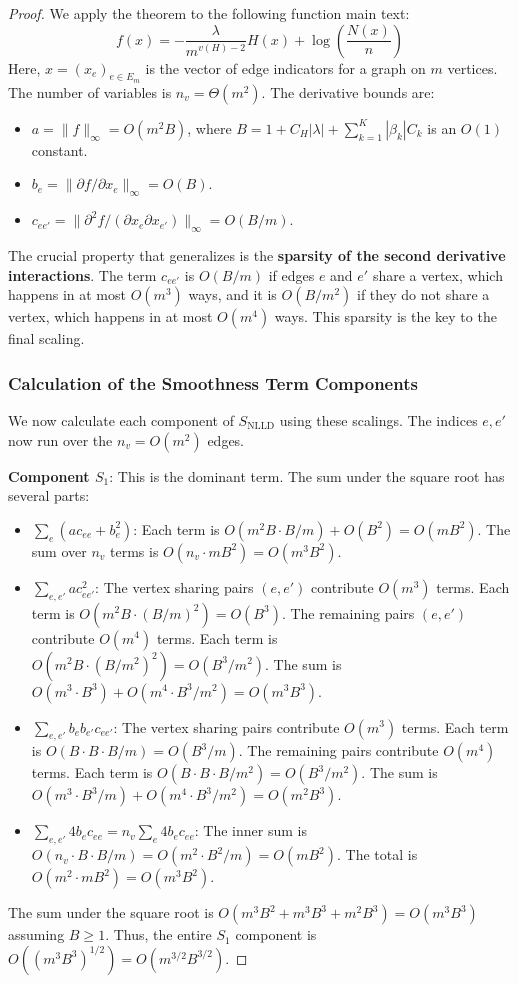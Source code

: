 \documentclass[12pt]{article}
\numberwithin{equation}{section}
\begin{document}
\begin{proof}
We apply the theorem to the following function main text:
\begin{equation}
f(x) = -\frac{\lambda}{m^{v(H)-2}}H(x) + \log\left(\frac{N(x)}{n}\right)
\end{equation}
Here, $x = (x_e)_{e \in E_m}$ is the vector of edge indicators for a graph on $m$ vertices. The number of variables is $n_v = \Theta(m^2)$. The derivative bounds are:
\begin{itemize}
    \item $a = \|f\|_\infty = O(m^2 B)$, where $B = 1 + C_H|\lambda| + \sum_{k=1}^K |\beta_k| C_k$ is an $O(1)$ constant.
    \item $b_e = \|\partial f / \partial x_e\|_\infty = O(B)$. 
    \item $c_{ee'} = \|\partial^2 f / (\partial x_e \partial x_{e'})\|_\infty = O(B/m)$. 
\end{itemize}
The crucial property that generalizes is the \textbf{sparsity of the second derivative interactions}. The term $c_{ee'}$ is \(O(B/m)\) if edges $e$ and $e'$ share a vertex, which happens in at most \(O(m^3)\) ways, and it is \(O(B/m^2)\) if they do not share a vertex, which happens in at most \(O(m^4)\) ways. This sparsity is the key to the final scaling.

\subsubsection*{Calculation of the Smoothness Term Components}
We now calculate each component of $S_{\text{NLLD}}$ using these scalings. The indices $e,e'$ now run over the $n_v = O(m^2)$ edges.

\textbf{Component $S_1$}: This is the dominant term. The sum under the square root has several parts:
\begin{itemize}
    \item $\sum_{e}^{} (ac_{ee} + b_e^2)$: Each term is $O(m^2 B \cdot B/m) + O(B^2) = O(mB^2)$. The sum over $n_v$ terms is $O(n_v \cdot mB^2) = O(m^3 B^2)$.
    \item $\sum_{e,e'}^{} ac_{ee'}^2$: The vertex sharing pairs \((e,e')\) contribute $O(m^3)$ terms. Each term is $O(m^2 B \cdot (B/m)^2) = O(B^3)$. The remaining pairs \((e,e')\) contribute $O(m^4)$ terms. Each term is $O(m^2 B \cdot (B/m^2)^2) = O(B^3/m^2)$. The sum is $O(m^3 \cdot B^3) + O(m^4 \cdot B^3/m^2) = O(m^3 B^3)$.
    \item $\sum_{e,e'}^{} b_e b_{e'} c_{ee'}$: The vertex sharing pairs contribute $O(m^3)$ terms. Each term is $O(B \cdot B \cdot B/m) = O(B^3/m)$. The remaining pairs contribute $O(m^4)$ terms. Each term is $O(B \cdot B \cdot B/m^2) = O(B^3/m^2)$. The sum is $O(m^3 \cdot B^3/m) + O(m^4 \cdot B^3/m^2) = O(m^2 B^3)$.
    \item $\sum_{e,e'}^{} 4b_e c_{ee} = n_v \sum_{e}^{} 4b_e c_{ee}$: The inner sum is $O(n_v \cdot B \cdot B/m) = O(m^2 \cdot B^2/m) = O(m B^2)$. The total is $O(m^2 \cdot mB^2) = O(m^3 B^2)$.
\end{itemize}
The sum under the square root is $O(m^3B^2 + m^3B^3 + m^2B^3) = O(m^3B^3)$ assuming $B \ge 1$. Thus, the entire $S_1$ component is $O((m^3 B^3)^{1/2}) = O(m^{3/2} B^{3/2})$.


\end{proof}
\end{document}
